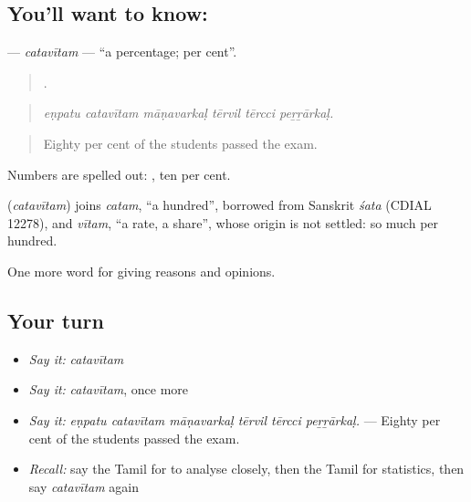 \subsection*{You'll want to know: }
\textbf{} — \emph{catavītam} — \textquotedblleft{}a percentage; per cent\textquotedblright{}.

\begin{quote}
     .
\end{quote}

\begin{quote}
\emph{eṇpatu catavītam māṇavarkaḷ tērvil tērcci peṟṟārkaḷ.}
\end{quote}

\begin{quote}
Eighty per cent of the students passed the exam.
\end{quote}

Numbers are spelled out:  , ten per cent.

\begin{cousinweb}
\textbf{} (\emph{catavītam}) joins \emph{catam}, \textquotedblleft{}a hundred\textquotedblright{}, borrowed from Sanskrit \emph{śata} (CDIAL 12278), and \emph{vītam}, \textquotedblleft{}a rate, a share\textquotedblright{}, whose origin is not settled: so much per hundred.
\end{cousinweb}

\begin{grammarlens}[title={What you've built}]
One more word for giving reasons and opinions.
\end{grammarlens}

\subsection*{Your turn}
\begin{itemize}
\raggedright
  \item \emph{Say it:} \emph{catavītam}
  \item \emph{Say it:} \emph{catavītam}, once more
  \item \emph{Say it:} \emph{eṇpatu catavītam māṇavarkaḷ tērvil tērcci peṟṟārkaḷ.} — Eighty per cent of the students passed the exam.
  \item \emph{Recall:} say the Tamil for to analyse closely, then the Tamil for statistics, then say \emph{catavītam} again
\end{itemize}

